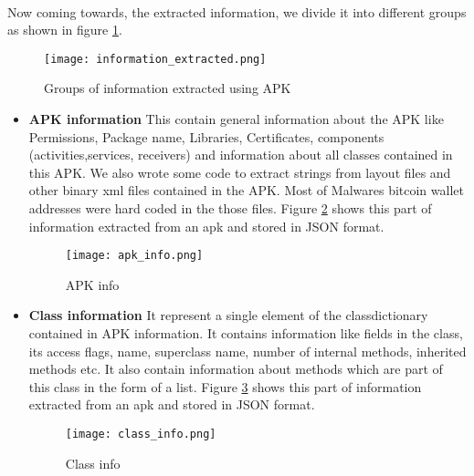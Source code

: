 \documentclass[../main.tex]{subfile}
\begin{document}
		\paragraph{} Now coming towards, the extracted information, we divide it into different groups as shown in figure \ref{fig:info_extracted}.
		
		\begin{figure}
			\texttt{[image: information\_extracted.png]}
			\caption{Groups of information extracted using APK}
			\label{fig:info_extracted}
		\end{figure}
		
		
		\begin{itemize}
			\item \textbf{APK information} This contain general information about the APK like Permissions, Package name, Libraries, Certificates, components (activities,services, receivers) and information about all classes contained in this APK. We also wrote some code to extract strings from layout files and other binary xml files contained in the APK. Most of Malwares bitcoin wallet addresses were hard coded in the those files. Figure \ref{fig:apk_info} shows this part of information extracted from an apk and stored in JSON format.
			\begin{figure}
						\texttt{[image: apk\_info.png]}
						\caption{APK info}
						\label{fig:apk_info}	
			\end{figure}
			
			\item \textbf{Class information} It represent a single element of the class\textunderscore dictionary contained in APK information. It contains information like fields in the class, its access flags, name, superclass name, number of internal methods, inherited methods etc. It also contain information about methods which are part of this class in the form of a list. Figure \ref{fig:class_info} shows this part of information extracted from an apk and stored in JSON format.
			\begin{figure}
				\texttt{[image: class\_info.png]}
				\caption{Class info}
				\label{fig:class_info}	
			\end{figure}
			

\end{itemize}
\end{document}
